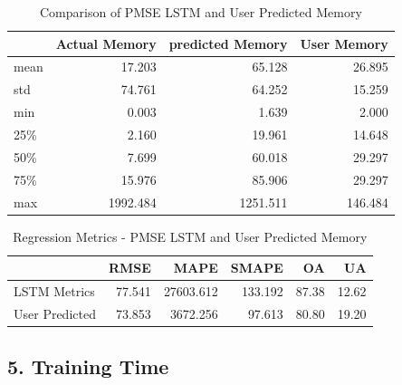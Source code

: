       \begin{table}
        \centering
        \caption{Comparison of PMSE LSTM and User Predicted Memory}
        \label{tab:comparison-pmse-lstm-user-predicted-memory}

        \begin{tabular}{|l|rrr|}
          \toprule
          {} &  Actual Memory &  predicted Memory &  User Memory \\
          \midrule
          mean &            17.203 &               65.128 &         26.895 \\
          std  &            74.761 &               64.252 &         15.259 \\
          min  &             0.003 &                1.639 &          2.000 \\
          25\%  &             2.160 &               19.961 &         14.648 \\
          50\%  &             7.699 &               60.018 &         29.297 \\
          75\%  &            15.976 &               85.906 &         29.297 \\
          max  &          1992.484 &             1251.511 &        146.484 \\
          \bottomrule
        \end{tabular}
      \end{table}
      
      \begin{table}
        \centering
        \caption{Regression Metrics - PMSE LSTM and User Predicted Memory}
        \label{tab:regression-metrics-pmse-lstm-user-predicted-memory}

        \begin{tabular}{|l|rrrrr|}
          \toprule
          {} &    RMSE &       MAPE &    SMAPE &     OA &     UA \\
          \midrule
          LSTM Metrics   &  77.541 &  27603.612 &  133.192 &  87.38 &  12.62 \\
          User Predicted &  73.853 &   3672.256 &   97.613 &  80.80 &  19.20 \\
          \bottomrule
        \end{tabular}
      \end{table}

  \subsection*{5. Training Time}
  \label{sec:training-time-evaluation-scenarios}

